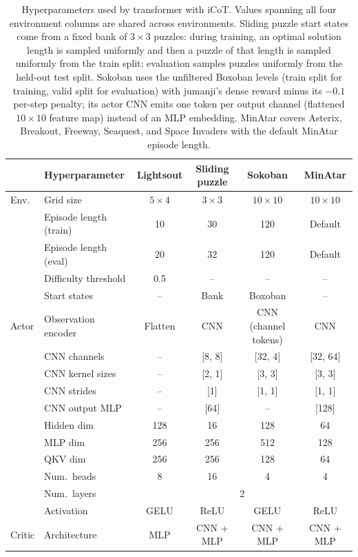 \begin{table}[p]
\centering
\caption{
Hyperparameters used by transformer with iCoT. Values spanning all four environment columns are shared across environments.
Sliding puzzle start states come from a fixed bank of $3\times3$ puzzles: during training, an optimal solution length is sampled uniformly and then a puzzle of that length is sampled uniformly from the train split; evaluation samples puzzles uniformly from the held-out test split.
Sokoban uses the unfiltered Boxoban levels (train split for training, valid split for evaluation) with jumanji's dense reward minus its $-0.1$ per-step penalty; its actor CNN emits one token per output channel (flattened $10\times10$ feature map) instead of an MLP embedding.
MinAtar covers Asterix, Breakout, Freeway, Seaquest, and Space Invaders with the default MinAtar episode length.
}
\small
\setlength{\tabcolsep}{4pt}
\begin{tabular}{llcccc}
\toprule
& Hyperparameter & Lightsout & Sliding puzzle & Sokoban & MinAtar \\
\toprule
Env.
  & Grid size & $5\times4$ & $3\times3$ & $10\times10$ & $10\times10$ \\
  & Episode length (train) & 10 & 30 & 120 & Default \\
  & Episode length (eval) & 20 & 32 & 120 & Default \\
  & Difficulty threshold & 0.5 & -- & -- & -- \\
  & Start states & -- & Bank & Boxoban & -- \\
\midrule
Actor
  & Observation encoder & Flatten & CNN & CNN (channel tokens) & CNN \\
  & CNN channels & -- & [8, 8] & [32, 4] & [32, 64] \\
  & CNN kernel sizes & -- & [2, 1] & [3, 3] & [3, 3] \\
  & CNN strides & -- & [1] & [1, 1] & [1, 1] \\
  & CNN output MLP & -- & [64] & -- & [128] \\
  & Hidden dim & 128 & 16 & 128 & 64 \\
  & MLP dim & 256 & 256 & 512 & 128 \\
  & QKV dim & 256 & 256 & 128 & 64 \\
  & Num.\ heads & 8 & 16 & 4 & 4 \\
  & Num.\ layers & \multicolumn{4}{c}{2} \\
  & Activation & GELU & ReLU & GELU & ReLU \\
\midrule
Critic
  & Architecture & MLP & CNN + MLP & CNN + MLP & CNN + MLP \\

\end{tabular}
\end{table}
